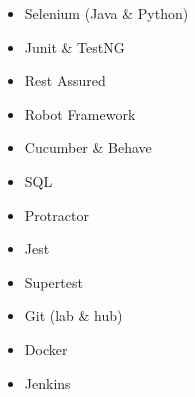 \documentclass[9pt]{developercv} %
\begin{document}
\vspace{0.5cm}


	
\begin{minipage}[t]{0.5\textwidth} %
	\vspace{-\baselineskip} %
	\begin{barchart}{5.5}
	\end{barchart}
\end{minipage}
\hfill %
\begin{minipage}[t]{0.53\textwidth} %
	\vspace{-\baselineskip} %
	
		\begin{minipage}[t]{0.5\textwidth}
		\begin{itemize}[label={\large\textbullet}]
		\setlength\itemsep{0.01em}
		\item Selenium (Java \& Python)
		\item Junit \& TestNG 
		\item Rest Assured
		\item Robot Framework
		\item Cucumber \& Behave
		\item SQL 
		\end{itemize}
		\end{minipage}
		\begin{minipage}[t]{0.5\textwidth}
		\begin{itemize}
			\setlength\itemsep{0.01em}
		\item Protractor
		\item Jest 
		\item Supertest
		\item Git (lab \& hub)
		\item Docker
		\item Jenkins
		\end{itemize}
	\end{minipage}
\end{minipage}
%
\end{document}
